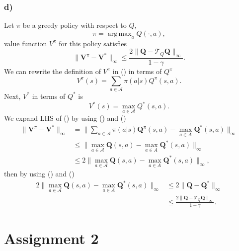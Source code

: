 \documentclass[12pt]{article}
\DeclareMathOperator*{\argmax}{arg\,max}
\begin{document}
\subsubsection*{d)}
Let $\pi$ be a greedy policy with respect to $Q$,
\begin{equation}
    \pi = \argmax_a Q(\cdot, a),
\end{equation}
value function $V^\pi$ for this policy satisfies
\begin{equation}
    \|\mathbf{V}^\pi - \mathbf{V}^*\|_\infty \leq \frac{2\|\mathbf{Q}-\mathcal{T}_Q\mathbf{Q}\|_\infty}{1-\gamma}.
    \label{eq:2dquest}
\end{equation}
We can rewrite the definition of $V^\pi$ in () in terms of $Q^\pi$
\begin{equation}
    V^\pi(s) = \sum_{a \in \mathcal{A}} \pi(a|s) Q^\pi(s,a).
    \label{eq:vpiinq}
\end{equation}
Next, $V^*$ in terms of $Q^*$ is
\begin{equation}
    V^*(s) = \max_{a\in \mathcal{A}}Q^*(s,a).
    \label{eq:vstar}
\end{equation}
We expand LHS of () by using () and ()
\begin{equation*}
    \begin{split}
        \|\mathbf{V}^\pi - \mathbf{V}^*\|_\infty &= \|\sum_{a \in \mathcal{A}} \pi(a|s) \mathbf{Q}^\pi(s,a) - \max_{a\in A}\mathbf{Q}^*(s,a)\|_\infty \\
        &\leq \|\max_{a\in \mathcal{A}}\mathbf{Q}(s,a) - \max_{a\in A}\mathbf{Q}^*(s,a)\|_\infty \\
        &\leq 2\|\max_{a\in \mathcal{A}}\mathbf{Q}(s,a) - \max_{a\in A}\mathbf{Q}^*(s,a)\|_\infty,
    \end{split}
\end{equation*}
then by using () and ()
\begin{equation*}
    \begin{split}
        2\|\max_{a\in \mathcal{A}}\mathbf{Q}(s,a) - \max_{a\in A}\mathbf{Q}^*(s,a)\|_\infty &\leq 2 \|\mathbf{Q}-\mathbf{Q}^*\|_\infty \\
        &\leq \frac{2\|\mathbf{Q} - \mathcal{T}_Q\mathbf{Q}\|_\infty}{1-\gamma}.
    \end{split}
\end{equation*}

\section*{Assignment 2}
\end{document}
